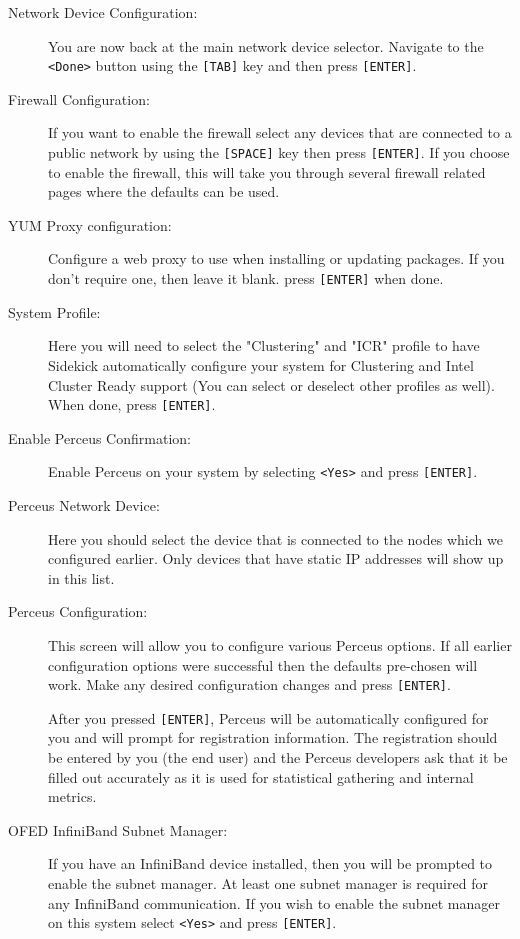 \documentclass[10pt,letterpaper]{article}
\begin{document}
\begin{description}
\item[Network Device Configuration:] You are now back at the main network
device selector. Navigate to the {\tt <Done>} button using the {\tt [TAB]}
key and then press {\tt [ENTER]}.

\item[Firewall Configuration:] If you want to enable the firewall select any
devices that are connected to a public network by using the {\tt [SPACE]} key
then press {\tt [ENTER]}. If you choose to enable the firewall, this will take
you through several firewall related pages where the defaults can be used.

\item[YUM Proxy configuration:] Configure a web proxy to use when installing
or updating packages. If you don't require one, then leave it blank. press
{\tt [ENTER]} when done.

\item[System Profile:] Here you will need to select the "Clustering" and
"ICR" profile to have Sidekick automatically configure your system for
Clustering and Intel Cluster Ready support (You can select or deselect other
profiles as well). When done, press {\tt [ENTER]}.

\item[Enable Perceus Confirmation:] Enable Perceus on your system by selecting
{\tt <Yes>} and press {\tt [ENTER]}.

\item[Perceus Network Device:] Here you should select the device that
is connected to the nodes which we configured earlier. Only devices that have
static IP addresses will show up in this list.

\item[Perceus Configuration:] This screen will allow you to configure
various Perceus options. If all earlier configuration options were successful
then the defaults pre-chosen will work. Make any desired configuration
changes and press {\tt [ENTER]}.

After you pressed {\tt [ENTER]}, Perceus will be automatically configured for
you and will prompt for registration information. The registration should be
entered by you (the end user) and the Perceus developers ask that it be filled
out accurately as it is used for statistical gathering and internal metrics.

\item[OFED InfiniBand Subnet Manager:] If you have an InfiniBand device
installed, then you will be prompted to enable the subnet manager. At least
one subnet manager is required for any InfiniBand communication. If you wish
to enable the subnet manager on this system select {\tt <Yes>} and press
{\tt [ENTER]}.


\end{description}
\end{document}
